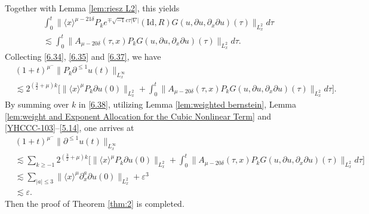 \documentclass[11pt,twoside]{article}
\def\f{\frac}
\def\p{\partial}
\def\ve{\varepsilon}
\def\ls{\lesssim}
\newcommand{\w}[1]{\langle {#1} \rangle}
\theoremstyle{plain}
\theoremstyle{definition}
\numberwithin{equation}{section}
\begin{document}
Together with Lemma \ref{lem:riesz L2}, this yields
\begin{equation}\label{6.37}
\begin{split}
&\int_{0}^{t}\big\|\w{x}^{\mu-21\delta}P_ke^{\mp \sqrt{-1}c\tau|\nabla|} (\mathrm{Id},R) G(u,\partial u,\p_x\p u)(\tau)\big\|_{L^2_x}d\tau\\
&\ls\int_{0}^{t}\big\|A_{\mu-20\delta}(\tau,x)P_k G(u,\partial u,\p_x\p u)(\tau)\big\|_{L^2_x}d\tau.
\end{split}
\end{equation}
Collecting \eqref{6.34}, \eqref{6.35} and \eqref{6.37}, we have
\begin{equation}\label{6.38}
\begin{split}
&(1+t)^{\mu^-}\|P_k\p^{\le 1} u(t)\|_{L^\infty_x}\\
&\ls 2^{(\f32+\mu) k}\big[\|\w{x}^{\mu}P_k\partial u(0)\|_{L^2_x}+
\int_{0}^{t}\big\|A_{\mu-20\delta}(\tau,x)P_k G(u,\partial u,\p_x\p u)(\tau)\big\|_{L^2_x}d\tau\big].
\end{split}
\end{equation}
By summing over $k$ in \eqref{6.38}, utilizing Lemma \ref{lem:weighted bernstein}, Lemma \ref{lem:weight and Exponent Allocation for the Cubic Nonlinear Term} and \eqref{YHCCC-103}--\eqref{5.14}, one arrives at
\begin{equation*}
\begin{split}
&(1+t)^{\mu^-}\|\p^{\le 1} u(t)\|_{L^\infty_x}\\
&\ls\sum_{k\ge -1}2^{(\f32+\mu) k}\big[
\|\w{x}^{\mu}P_k\partial u(0)\|_{L^2_x}
+\int_{0}^{t}\big\|A_{\mu-20\delta}(\tau,x)P_k G(u,\partial u,\p_x\p u)(\tau)\big\|_{L^2_x}d\tau\big]\\
&\ls\sum_{|a|\le 3}\|\w{x}^{\mu}\p^a_x\partial u(0)\|_{L^2_x}+\ve^3\\
&\ls\ve.
\end{split}	
\end{equation*}
Then the proof of Theorem \ref{thm:2} is completed.


\appendix
\end{document}
